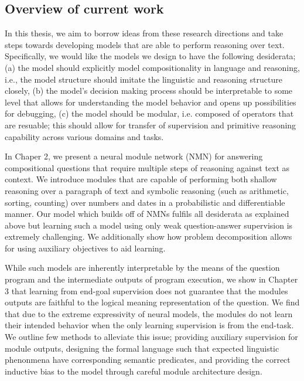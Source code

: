 \documentclass[main.tex]{subfiles}
\begin{document}


\subsection{Overview of current work}
In this thesis, we aim to borrow ideas from these research directions and take steps towards developing models that are able to perform reasoning over text.  Specifically, we would like the models we design to have the following desiderata; (a) the model should explicitly model compositionality in language and reasoning, i.e., the model structure should imitate the linguistic and reasoning structure closely, (b) the model's decision making process should be interpretable to some level that allows for understanding the model behavior and opens up possibilities for debugging, (c) the model should be modular, i.e. composed of operators that are resuable; this should allow for transfer of supervision and primitive reasoning capability across various domains and tasks.

In Chaper 2, we present a neural module network (NMN) for answering compositional questions that require multiple steps of reasoning against text as context.  We introduce modules that are capable of performing both shallow reasoning over a paragraph of text and symbolic reasoning (such as arithmetic, sorting, counting) over numbers and dates in a probabilistic and differentiable manner.  Our model which builds off of NMNs fulfils all desiderata as explained above but learning such a model using only weak question-answer supervision is extremely challenging.  We additionally show how problem decomposition allows for using auxiliary objectives to aid learning.

While such models are inherently interpretable by the means of the question program and the intermediate outputs of program execution, we show in Chapter 3 that learning from end-goal supervision does not guarantee that the modules outputs are faithful to the logical meaning representation of the question.  We find that due to the extreme expressivity of neural models, the modules do not learn their intended behavior when the only learning supervision is from the end-task.  We outline few methods to alleviate this issue; providing auxiliary supervision for module outputs, designing the formal language such that expected linguistic phenonmena have corresponding semantic predicates, and providing the correct inductive bias to the model through careful module architecture design.
\end{document}
